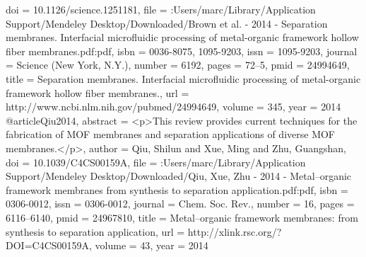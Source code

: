 {doi = {10.1126/science.1251181},
file = {:Users/marc/Library/Application Support/Mendeley Desktop/Downloaded/Brown et al. - 2014 - Separation membranes. Interfacial microfluidic processing of metal-organic framework hollow fiber membranes.pdf:pdf},
isbn = {0036-8075, 1095-9203},
issn = {1095-9203},
journal = {Science (New York, N.Y.)},
number = {6192},
pages = {72--5},
pmid = {24994649},
title = {{Separation membranes. Interfacial microfluidic processing of metal-organic framework hollow fiber membranes.}},
url = {http://www.ncbi.nlm.nih.gov/pubmed/24994649},
volume = {345},
year = {2014}
}
@article{Qiu2014,
abstract = {{\textless}p{\textgreater}This review provides current techniques for the fabrication of MOF membranes and separation applications of diverse MOF membranes.{\textless}/p{\textgreater}},
author = {Qiu, Shilun and Xue, Ming and Zhu, Guangshan},
doi = {10.1039/C4CS00159A},
file = {:Users/marc/Library/Application Support/Mendeley Desktop/Downloaded/Qiu, Xue, Zhu - 2014 - Metal–organic framework membranes from synthesis to separation application.pdf:pdf},
isbn = {0306-0012},
issn = {0306-0012},
journal = {Chem. Soc. Rev.},
number = {16},
pages = {6116--6140},
pmid = {24967810},
title = {{Metal–organic framework membranes: from synthesis to separation application}},
url = {http://xlink.rsc.org/?DOI=C4CS00159A},
volume = {43},
year = {2014}
}
